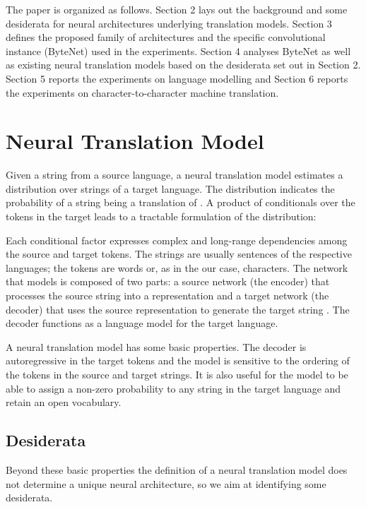 \documentclass{article}
\begin{document}
The paper is organized as follows. Section 2 lays out the background and some desiderata for neural architectures underlying translation models. Section 3 defines the proposed family of architectures and the specific convolutional instance (ByteNet) used in the experiments. Section 4 analyses ByteNet as well as existing neural translation models based on the desiderata set out in Section 2. Section 5 reports the experiments on language modelling and Section 6 reports the experiments on character-to-character machine translation.



\section{Neural Translation Model}
\label{NTM}
Given a string  from a source language, a neural translation model estimates a distribution  over strings  of a target language. The distribution indicates the probability of a string  being a translation of . A product of conditionals over the tokens in the target  leads to a tractable formulation of the distribution:

Each conditional factor expresses complex and long-range dependencies among the source and target tokens. The strings are usually sentences of the respective languages; the tokens are words or, as in the our case, characters.
The network that models  is composed of two parts: a source network (the encoder) that processes the source string into a representation and a target network (the decoder) that uses the source representation to generate the target string \citep{kalchbrenner13emnlp}. The decoder  functions as a language model for the target language.


A neural translation model has some basic properties. The decoder is autoregressive in the target tokens and the model is sensitive to the ordering of the tokens in the source and target strings. It is also useful for the model to be able to assign a non-zero probability to any string in the target language and retain an open vocabulary.

\subsection{Desiderata}
\label{desiderata}

Beyond these basic properties the definition of a neural translation model does not determine a unique neural architecture, so we aim at identifying some desiderata.
\end{document}
